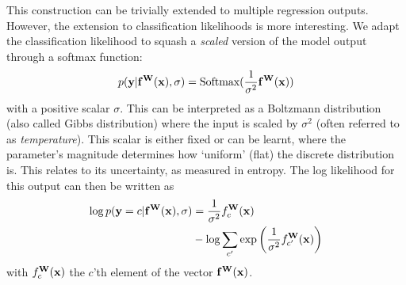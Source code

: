 This construction can be trivially extended to multiple regression outputs. However, the extension to classification likelihoods is more interesting. We adapt the classification likelihood to squash a \textit{scaled} version of the model output through a softmax function:
\begin{equation}
p(\mathbf{y} | \mathbf{f}^{\mathbf{W}}(\mathbf{x}), \sigma) = \text{Softmax}( \frac{1}{\sigma^2} \mathbf{f}^{\mathbf{W}}(\mathbf{x}))
\end{equation}
with a positive scalar $\sigma$. 
This can be interpreted as a Boltzmann distribution (also called Gibbs distribution) where the input is scaled by $\sigma^2$ (often referred to as \textit{temperature}). This scalar is either fixed or can be learnt, where the parameter's magnitude determines how `uniform' (flat) the discrete distribution is. This relates to its uncertainty, as measured in entropy.
The log likelihood for this output can then be written as 
\begin{equation}
\begin{split}
\log p(\mathbf{y} = c | \mathbf{f}^{\mathbf{W}}(\mathbf{x}), \sigma) &= \frac{1}{\sigma^2} f^{\mathbf{W}}_c(\mathbf{x}) \\
&- \log \sum_{c'} \exp \bigg( \frac{1}{\sigma^2} f^{\mathbf{W}}_{c'}(\mathbf{x}) \bigg)
\end{split}
\end{equation}
with $f^{\mathbf{W}}_c(\mathbf{x})$ the $c$'th element of the vector $\mathbf{f}^{\mathbf{W}}(\mathbf{x})$. 

